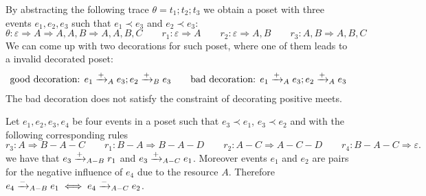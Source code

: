 
\begin{example}
  By abstracting the following trace $\theta=t_1;t_2;t_3$ we obtain a poset with three events $e_1,e_2,e_3$ such that $e_1\prec e_3$ and $e_2\prec e_3$:
  \[
  \theta:\varepsilon \Rightarrow A \Rightarrow A,A,B\Rightarrow A,A,B,C\qquad r_1: \varepsilon \Rightarrow A\qquad r_2: \varepsilon\Rightarrow A,B\qquad r_3: A,B\Rightarrow A,B,C
  \]
  We can come up with two decorations for such poset, where one of them leads to a invalid decorated poset:
  \begin{align*}
  \text{good decoration: }e_1\mathrel{\xrightarrow{+}}_A e_3; e_2\mathrel{\xrightarrow{+}}_B e_3\qquad
  \text{bad decoration: }e_1\mathrel{\xrightarrow{+}}_A e_3; e_2\mathrel{\xrightarrow{+}}_A e_3
  \end{align*}
  The bad decoration does not satisfy the constraint of decorating positive meets.
\end{example}

\begin{example}
  Let $e_1,e_2,e_3,e_4$ be four events in a poset such that $e_3\prec e_1$, $e_3\prec e_2$ and with the following corresponding rules
  \[
  r_3: A \Rightarrow B-A-C\qquad r_1: B-A\Rightarrow B-A-D \qquad r_2: A-C\Rightarrow A-C-D\qquad r_4: B-A-C\Rightarrow \varepsilon.
  \]
  we have that $e_3\mathrel{\xrightarrow{+}}_{A-B} r_1$ and $e_3\mathrel{\xrightarrow{+}}_{A-C} e_1$. Moreover events $e_1$ and $e_2$ are pairs for the negative influence of $e_4$ due to the resource $A$. Therefore $e_4\mathrel{\xrightarrow{-}}_{A-B} e_1 \iff e_4\mathrel{\xrightarrow{-}}_{A-C} e_2$.
\end{example}

